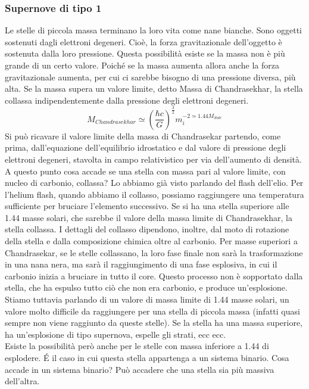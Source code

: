 \documentclass[a4paper,11pt]{article}
\begin{document}
\subsubsection{Supernove di tipo 1}
Le stelle di piccola massa terminano la loro vita come nane bianche. Sono oggetti sostenuti dagli elettroni degeneri. Cioè, la forza gravitazionale dell'oggetto è sostenuta dalla loro pressione. Questa possibilità esiste se la massa non è più grande di un certo valore. Poiché se la massa aumenta allora anche la forza gravitazionale aumenta, per cui ci sarebbe bisogno di una pressione diversa, più alta. Se la massa supera un valore limite, detto Massa di Chandrasekhar, la stella collassa indipendentemente dalla pressione degli elettroni degeneri.\\ 
$$
M_{Chandrasekhar} \simeq (\frac{\hbar c}{G})^{\frac{3}{2}} m_{i}^{-2 \simeq 1.44 M_{Sole}}
$$
Si può ricavare il valore limite della massa di Chandrasekar partendo, come prima, dall'equazione dell'equilibrio idrostatico e dal valore di pressione degli elettroni degeneri, stavolta in campo relativistico per via dell'aumento di densità. \\
A questo punto cosa accade se una stella con massa pari al valore limite, con nucleo di carbonio, collassa? Lo abbiamo già visto parlando del flash dell'elio. Per l'helium flash, quando abbiamo il collasso, possiamo raggiungere una temperatura sufficiente per bruciare l'elemento successivo. Se si ha una stella superiore alle 1.44 masse solari, che sarebbe il valore della massa limite di Chandrasekhar, la stella collassa. I dettagli del collasso dipendono, inoltre, dal moto di rotazione della stella e dalla composizione chimica oltre al carbonio. Per masse superiori a Chandrasekar, se le stelle collassano, la loro fase finale non sarà la trasformazione in una nana nera, ma sarà il raggiungimento di una fase esplosiva, in cui il carbonio inizia a bruciare in tutto il core. Questo processo non è sopportato dalla stella, che ha espulso tutto ciò che non era carbonio, e produce un'esplosione. Stiamo tuttavia parlando di un valore di massa limite di 1.44 masse solari, un valore molto difficile da raggiungere per una stella di piccola massa (infatti quasi sempre non viene raggiunto da queste stelle). Se la stella ha una massa superiore, ha un'esplosione di tipo supernova, espelle gli strati, ecc ecc. \\ Esiste la possibilità però anche per le stelle con massa inferiore a 1.44 di esplodere. \'E il caso in cui questa stella appartenga a un sistema binario. Cosa accade in un sistema binario? Può accadere che una stella sia più massiva dell'altra.
\end{document}
